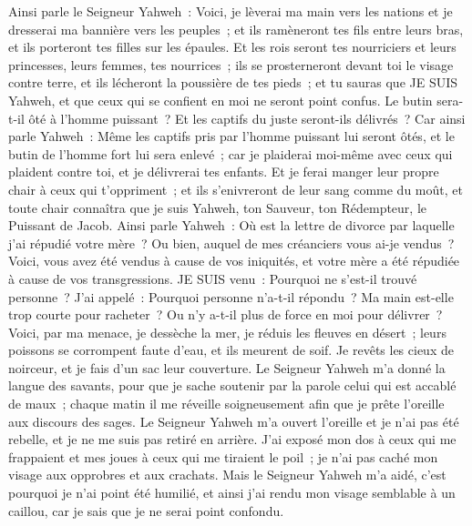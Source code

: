 \begin{multicols}{2}
Ainsi parle le Seigneur Yahweh~: Voici, je lèverai ma main vers les nations et je dresserai ma bannière vers les peuples~; et ils ramèneront tes fils entre leurs bras, et ils porteront tes filles sur les épaules.
Et les rois seront tes nourriciers et leurs princesses, leurs femmes, tes nourrices~; ils se prosterneront devant toi le visage contre terre, et ils lécheront la poussière de tes pieds~; et tu sauras que JE SUIS Yahweh, et que ceux qui se confient en moi ne seront point confus.
Le butin sera-t-il ôté à l'homme puissant~? Et les captifs du juste seront-ils délivrés~?
Car ainsi parle Yahweh~: Même les captifs pris par l'homme puissant lui seront ôtés, et le butin de l'homme fort lui sera enlevé~; car je plaiderai moi-même avec ceux qui plaident contre toi, et je délivrerai tes enfants.
Et je ferai manger leur propre chair à ceux qui t'oppriment~; et ils s'enivreront de leur sang comme du moût, et toute chair connaîtra que je suis Yahweh, ton Sauveur, ton Rédempteur, le Puissant de Jacob.
\VerseOne{}Ainsi parle Yahweh~: Où est la lettre de divorce par laquelle j'ai répudié votre mère~? Ou bien, auquel de mes créanciers vous ai-je vendus~? Voici, vous avez été vendus à cause de vos iniquités, et votre mère a été répudiée à cause de vos transgressions.
JE SUIS venu~: Pourquoi ne s'est-il trouvé personne~? J'ai appelé~: Pourquoi personne n'a-t-il répondu~? Ma main est-elle trop courte pour racheter~? Ou n'y a-t-il plus de force en moi pour délivrer~? Voici, par ma menace, je dessèche la mer, je réduis les fleuves en désert~; leurs poissons se corrompent faute d'eau, et ils meurent de soif.
Je revêts les cieux de noirceur, et je fais d'un sac leur couverture.
Le Seigneur Yahweh m'a donné la langue des savants, pour que je sache soutenir par la parole celui qui est accablé de maux~; chaque matin il me réveille soigneusement afin que je prête l'oreille aux discours des sages.
Le Seigneur Yahweh m'a ouvert l'oreille et je n'ai pas été rebelle, et je ne me suis pas retiré en arrière.
J'ai exposé mon dos à ceux qui me frappaient et mes joues à ceux qui me tiraient le poil~; je n'ai pas caché mon visage aux opprobres et aux crachats.
Mais le Seigneur Yahweh m'a aidé, c'est pourquoi je n'ai point été humilié, et ainsi j'ai rendu mon visage semblable à un caillou, car je sais que je ne serai point confondu.

\end{multicols}
